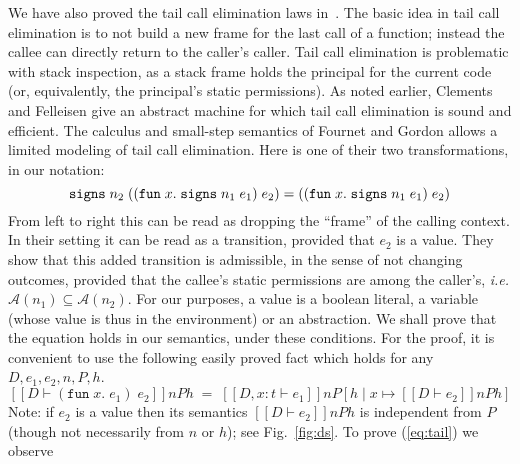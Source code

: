 \documentclass[submission,copyright,creativecommons]{eptcs}
\newcommand{\ie}{{\em i.e.}}
\newcommand{\signs}[2]{\SIGNS\;#1\;#2}
\newcommand{\A}{\mathcal{A}}
\newcommand{\ldb}{[\![}
\newcommand{\rdb}{]\!]}
\newcommand{\means}[1]{\ldb {#1}\rdb}
\newcommand{\proves}{\vdash}
\newcommand{\ext}[3]{[#1\mid#2\!\mapsto\!#3]}
\newcommand{\SIGNS}{\mbox{\texttt{signs}}}
\newcommand{\LAM}[2]{{\mathtt{fun}\; #1.\; #2}}
\newcommand{\n}{n} \newcommand{\p}{p} \newcommand{\Ps}{\Pi} \newcommand{\h}{h}
\begin{document}
We have also proved the tail call elimination laws in~\cite[Section 5.2]{FournetG03}. The basic idea in tail call elimination is to not build a new frame for the last call of a function; instead the callee
can directly return to the caller's caller. 
Tail call elimination is problematic with stack inspection, as a stack frame holds the principal for the current code (or, equivalently, the principal's static permissions).
As noted earlier, Clements and Felleisen \cite{ClementsF04} give an abstract machine for which tail call elimination is sound and efficient.  The calculus and small-step semantics of Fournet and Gordon \cite[Section 5.2]{FournetG03} allows a limited modeling of tail call elimination.  Here is one of their two transformations, in our notation:
\begin{equation}\label{eq:tail}
 \signs{\n_2}{ ((\LAM{x}{ \signs{\n_1}{e_1}}) \; e_2) }
  = ((\LAM{x}{ \signs{\n_1}{e_1}}) \; e_2)
\end{equation}
From left to right this can be read as dropping the ``frame'' of the calling context.  In their setting it can be read as a transition, provided that $e_2$ is a value.
They show that this added transition is admissible, in the sense of not changing outcomes, provided that 
the callee's static permissions are among the caller's, \ie $\A(n_1)\subseteq\A(n_2)$. 
For our purposes, a value is a boolean literal, a variable (whose value is thus in the environment) or an abstraction.
We shall prove that the equation holds in our semantics, under these conditions.
For the proof, it is convenient to use the following easily proved fact which holds for any $D, e_1, e_2, \n, P, h$.
\begin{equation}\label{eq:appLam}
\means{D\proves (\LAM{x}{ e_1 }) \; e_2 }\n P \h
\;=\;
\means{D,x:t\proves  e_1 }\n P \ext{\h}{x}{ \means{D\proves e_2}\n P \h }
\end{equation}
Note: if $e_2$ is a value then its semantics $\means{D\proves e_2}\n P \h$ is independent from $P$ (though not necessarily from $\n$ or $\h$); see Fig.~\ref{fig:ds}.
To prove (\ref{eq:tail}) we observe
\end{document}
